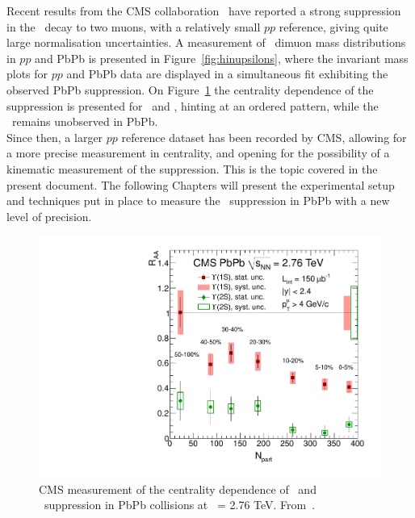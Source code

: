 Recent results from the CMS collaboration~\cite{torsten,HIN-11-007,11-011} have reported a strong
suppression in the \PgU~decay to two muons, with a relatively small
$pp$ reference, giving quite large normalisation uncertainties. A measurement of
\PgU\ dimuon mass distributions in $pp$ and PbPb is presented in Figure~\ref{fig:hinupsilons}, where
the invariant mass plots for $pp$ and PbPb data are displayed in a
simultaneous fit exhibiting the observed PbPb suppression. On
Figure~\ref{fig:hinupsilonsraa} the centrality dependence of the suppression is
presented for \PgUa~and \PgUb, hinting at an ordered pattern, while
the \PgUc~remains unobserved in PbPb.
\\
Since then, a larger $pp$ reference dataset has been recorded by CMS,
allowing for a more precise measurement in centrality, and opening for
the possibility of a kinematic measurement of the suppression. This is
the topic covered in the present document. The following Chapters
will present the experimental setup and techniques put in place to
measure the \PgU~suppression in PbPb with a new level of precision.
\begin{figure}[t]
\begin{center}
  \includegraphics[height=0.4\textheight]{Chapters/pQuarkonia/RaaPt4.pdf}
  \caption{CMS measurement of the centrality dependence of \PgUa\ and
    \PgUb\ suppression in PbPb
    collisions at \snn\ = 2.76 TeV. From~\cite{11-011}.}
  \label{fig:hinupsilonsraa}
\end{center}
\end{figure}



\vspace{0.5em}
\begin{center}
\end{center}

